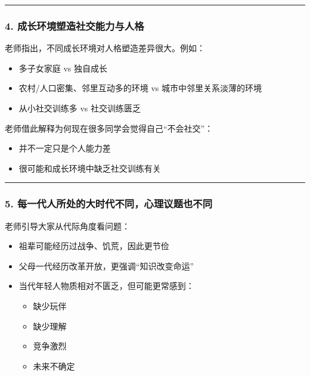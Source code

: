 \documentclass[
  chinese,
  9pt,
  a4paper,
]{ctexart}
\providecommand{\tightlist}{%
  \setlength{\itemsep}{0pt}\setlength{\parskip}{0pt}}
\begin{document}
\begin{center}\rule{0.5\linewidth}{0.5pt}\end{center}

\subsubsection{4.
成长环境塑造社交能力与人格}\label{ux6210ux957fux73afux5883ux5851ux9020ux793eux4ea4ux80fdux529bux4e0eux4ebaux683c}

老师指出，不同成长环境对人格塑造差异很大。例如：

\begin{itemize}
\tightlist
\item
  多子女家庭 vs 独自成长
\item
  农村/人口密集、邻里互动多的环境 vs 城市中邻里关系淡薄的环境
\item
  从小社交训练多 vs 社交训练匮乏
\end{itemize}

老师借此解释为何现在很多同学会觉得自己``不会社交''：

\begin{itemize}
\tightlist
\item
  并不一定只是个人能力差
\item
  很可能和成长环境中缺乏社交训练有关
\end{itemize}

\begin{center}\rule{0.5\linewidth}{0.5pt}\end{center}

\subsubsection{5.
每一代人所处的大时代不同，心理议题也不同}\label{ux6bcfux4e00ux4ee3ux4ebaux6240ux5904ux7684ux5927ux65f6ux4ee3ux4e0dux540cux5fc3ux7406ux8baeux9898ux4e5fux4e0dux540c}

老师引导大家从代际角度看问题：

\begin{itemize}
\item
  祖辈可能经历过战争、饥荒，因此更节俭
\item
  父母一代经历改革开放，更强调``知识改变命运''
\item
  当代年轻人物质相对不匮乏，但可能更常感到：

  \begin{itemize}
  \tightlist
  \item
    缺少玩伴
  \item
    缺少理解
  \item
    竞争激烈
  \item
    未来不确定
  \end{itemize}
\end{itemize}
\end{document}
